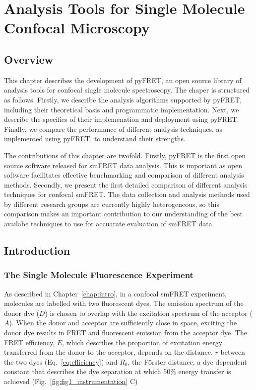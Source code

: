 \chapter{Analysis Tools for Single Molecule Confocal Microscopy}
\label{chap:pyfret}
\section{Overview}
This chapter describes the development of pyFRET, an open source library of analysis tools for confocal single molecule spectroscopy. The chaper is structured as follows. Firstly, we describe the analysis algorithms supported by pyFRET, including their theoretical basis and programmatic implementation. Next, we describe the specifics of their implemenation and deployment using pyFRET. Finally, we compare the performance of different analysis techniques, as implemented using pyFRET, to understand their strengths. 

The contributions of this chapter are twofold. Firstly, pyFRET is the first open source software released for smFRET data analysis. This is important as open software facilitates effective benchmarking and comparison of different analysis methods. Secondly, we present the first detailed comparison of different analysis techniques for confocal smFRET. The data collection and analysis methods used by different research groups are currently highly heterogeneous, so this comparison makes an important contribution to our understanding of the best availabe techniques to use for accuarate evaluation of smFRET data.  

\section{Introduction}
\subsection{The Single Molecule Fluorescence Experiment}

As described in Chapter~\ref{chap:intro}, in a confocal smFRET experiment, molecules are labelled with two fluorescent dyes. The emission spectrum of the donor dye ($D$) is chosen to overlap with the excitation spectrum of the acceptor ($A$). When the donor and acceptor are sufficiently close in space, exciting the donor dye results in FRET and fluorescent emission from the acceptor dye. The FRET efficiency, $E$, which describes the proportion of excitation energy transferred from the donor to the acceptor, depends on the distance, $r$ between the two dyes (Eq.~\ref{eq:efficiency}) and $R_0$, the F\"{o}rster distance, a dye dependent constant that describes the dye separation at which 50\% energy transfer is achieved (Fig.~\ref{fig:fig1_instrumentation} C)


